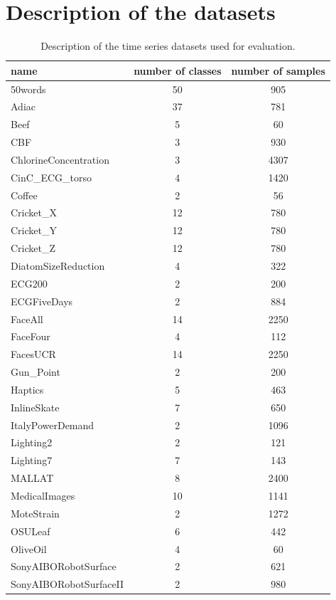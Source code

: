 \documentclass[natbib,smallextended]{svjour3}
\begin{document}
\appendix

\section{Description of the datasets}
\label{sec:appendix}

\begin{table} [h!]
\begin{center}
\caption{Description of the time series datasets used for evaluation.}
\label{didtNoda1}
\small
 \setlength{\tabcolsep}{.16667em}
\begin{tabular}{lcc}
name & number of classes & number of samples \\
\hline
50words & 50 &  905 \\
Adiac & 37 &  781 \\
Beef &  5 &   60 \\
CBF  &  3 &  930 \\
ChlorineConcentration  &  3 & 4307 \\
CinC\_ECG\_torso  &  4 & 1420 \\
Coffee  &  2 &   56 \\
Cricket\_X  & 12 &  780 \\
Cricket\_Y  & 12 &  780 \\
Cricket\_Z  & 12 &  780 \\
DiatomSizeReduction  &  4 &  322 \\
ECG200  &  2 &  200 \\
ECGFiveDays  &  2 &  884 \\
FaceAll &  14 & 2250 \\
FaceFour &   4 &  112 \\
FacesUCR &  14 & 2250 \\
Gun\_Point &   2 &  200 \\
Haptics &   5 &  463 \\
InlineSkate  &  7 &  650 \\
ItalyPowerDemand  &  2 & 1096 \\
Lighting2  &  2 &  121 \\
Lighting7  &  7 &  143 \\
MALLAT  &  8 & 2400 \\
MedicalImages  & 10 & 1141 \\
MoteStrain  &  2 & 1272 \\
OSULeaf &   6 &  442 \\
OliveOil &   4 &   60 \\
SonyAIBORobotSurface &   2 &  621 \\
SonyAIBORobotSurfaceII &   2 &  980 \\

\end{tabular}
\end{center}
\end{table}
\end{document}
